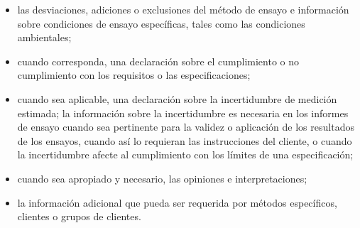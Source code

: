 			\begin{itemize}
				\item las desviaciones, adiciones o exclusiones del método de ensayo e información sobre condiciones de
				ensayo específicas, tales como las condiciones ambientales;
				
				\item cuando corresponda, una declaración sobre el cumplimiento o no cumplimiento con los requisitos o las
				especificaciones;
				
				\item cuando sea aplicable, una declaración sobre la incertidumbre de medición estimada; la información
				sobre la incertidumbre es necesaria en los informes de ensayo cuando sea pertinente para la validez o
				aplicación de los resultados de los ensayos, cuando así lo requieran las instrucciones del cliente, o
				cuando la incertidumbre afecte al cumplimiento con los límites de una especificación;
				
				\item cuando sea apropiado y necesario, las opiniones e interpretaciones;
				
				\item la información adicional que pueda ser requerida por métodos específicos, clientes o grupos de clientes.
			\end{itemize}
				
				
		